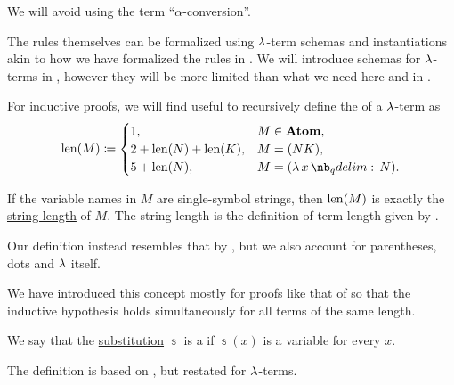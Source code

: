\begin{comments}
  We will avoid using the term \enquote{\( \alpha \)-conversion}.

  \item The rules themselves can be formalized using \( \mathrm{\lambda} \)-term schemas and instantiations akin to how we have formalized the rules in . We will introduce schemas for \( \mathrm{\lambda} \)-terms in , however they will be more limited than what we need here and in .
\end{comments}

\begin{definition}\label{def:lambda_term_length}\mimprovised
  For inductive proofs, we will find useful to recursively define the  of a \( \mathrm{\lambda} \)-term as
  \begin{equation*}
    \len(M) \coloneqq \begin{cases}
      1,                     &M \in \op*{Atom}, \\
      2 + \len(N) + \len(K), &M = (NK), \\
      5 + \len(N),           &M = (\qabs x N). \\
    \end{cases}
  \end{equation*}
\end{definition}
\begin{comments}
  \item If the variable names in \( M \) are single-symbol strings, then \( \operatorname{len}(M) \) is exactly the \hyperref[def:formal_language/string_length]{string length} of \( M \). The string length is the definition of term length given by .

  Our definition instead resembles that by , but we also account for parentheses, dots and \( \mathrm{\lambda} \) itself.

  \item We have introduced this concept mostly for proofs like that of  so that the inductive hypothesis holds simultaneously for all terms of the same length.
\end{comments}

\begin{definition}\label{def:lambda_renaming}
  We say that the \hyperref[def:lambda_term_substitution]{substitution} \( \Bbbs \) is a  if \( \Bbbs(x) \) is a variable for every \( x \).
\end{definition}
\begin{comments}
  \item The definition is based on \cite[252]{Mimram2020ProgramEqualsProof}, but restated for \( \mathrm{\lambda} \)-terms.
\end{comments}

